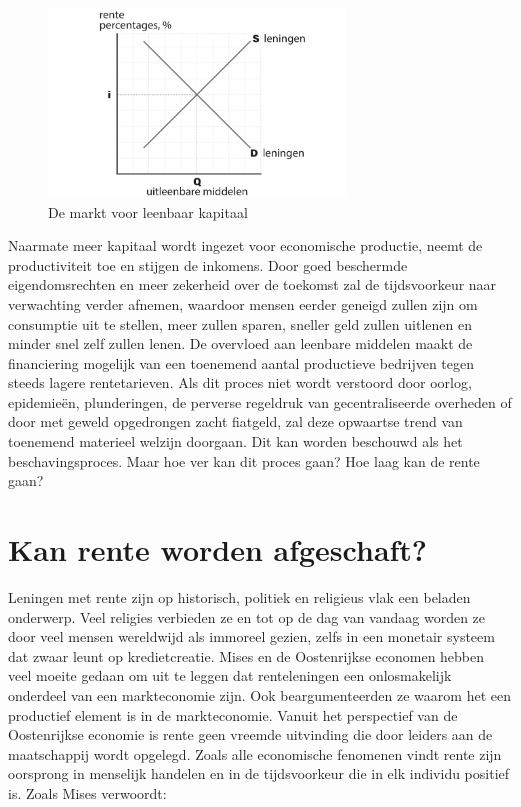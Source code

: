 \begin{figure}
\centering
    \includegraphics[width=0.7\textwidth]{figures/fig30-1.png}
    \caption[De markt voor leenbaar kapitaal]{De markt voor leenbaar kapitaal}
    \label{fig30}
\end{figure}

Naarmate meer kapitaal wordt ingezet voor economische productie, neemt de productiviteit toe en stijgen de inkomens. Door goed beschermde eigendomsrechten en meer zekerheid over de toekomst zal de tijdsvoorkeur naar verwachting verder afnemen, waardoor mensen eerder geneigd zullen zijn om consumptie uit te stellen, meer zullen sparen, sneller geld zullen uitlenen en minder snel zelf zullen lenen. De overvloed aan leenbare middelen maakt de financiering mogelijk van een toenemend aantal productieve bedrijven tegen steeds lagere rentetarieven. Als dit proces niet wordt verstoord door oorlog, epidemieën, plunderingen, de perverse regeldruk van gecentraliseerde overheden of door met geweld opgedrongen zacht fiatgeld, zal deze opwaartse trend van toenemend materieel welzijn doorgaan. Dit kan worden beschouwd als het beschavingsproces. Maar hoe ver kan dit proces gaan? Hoe laag kan de rente gaan?

\hypertarget{kan-rente-worden-afgeschaft}{%
\section{Kan rente worden afgeschaft?}\label{kan-rente-worden-afgeschaft}}

Leningen met rente zijn op historisch, politiek en religieus vlak een beladen onderwerp. Veel religies verbieden ze en tot op de dag van vandaag worden ze door veel mensen wereldwijd als immoreel gezien, zelfs in een monetair systeem dat zwaar leunt op kredietcreatie. Mises en de Oostenrijkse economen hebben veel moeite gedaan om uit te leggen dat renteleningen een onlosmakelijk onderdeel van een markteconomie zijn. Ook beargumenteerden ze waarom het een productief element is in de markteconomie. Vanuit het perspectief van de Oostenrijkse economie is rente geen vreemde uitvinding die door leiders aan de maatschappij wordt opgelegd. Zoals alle economische fenomenen vindt rente zijn oorsprong in menselijk handelen en in de tijdsvoorkeur die in elk individu positief is. Zoals Mises verwoordt:

